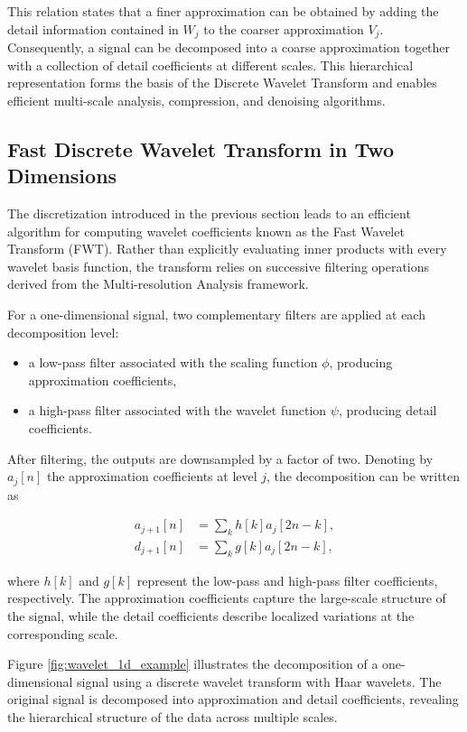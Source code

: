 This relation states that a finer approximation can be obtained by adding the detail information contained in $W_j$ to the coarser approximation $V_j$. Consequently, a signal can be decomposed into a coarse approximation together with a collection of detail coefficients at different scales. This hierarchical representation forms the basis of the Discrete Wavelet Transform and enables efficient multi-scale analysis, compression, and denoising algorithms.



\subsection{Fast Discrete Wavelet Transform in Two Dimensions}

The discretization introduced in the previous section leads to an efficient algorithm for computing wavelet coefficients known as the Fast Wavelet Transform (FWT). Rather than explicitly evaluating inner products with every wavelet basis function, the transform relies on successive filtering operations derived from the Multi-resolution Analysis framework.

For a one-dimensional signal, two complementary filters are applied at each decomposition level:

\begin{itemize}
    \item a low-pass filter associated with the scaling function $\phi$, producing approximation coefficients,
    \item a high-pass filter associated with the wavelet function $\psi$, producing detail coefficients.
\end{itemize}

After filtering, the outputs are downsampled by a factor of two. Denoting by $a_j[n]$ the approximation coefficients at level $j$, the decomposition can be written as

\begin{align}
a_{j+1}[n]
&=
\sum_k h[k] a_j[2n-k], \\
d_{j+1}[n]
&=
\sum_k g[k] a_j[2n-k],
\end{align}

where $h[k]$ and $g[k]$ represent the low-pass and high-pass filter coefficients, respectively. The approximation coefficients capture the large-scale structure of the signal, while the detail coefficients describe localized variations at the corresponding scale. 

Figure \ref{fig:wavelet_1d_example} illustrates the decomposition of a one-dimensional signal using a discrete wavelet transform with Haar wavelets. The original signal is decomposed into approximation and detail coefficients, revealing the hierarchical structure of the data across multiple scales.


